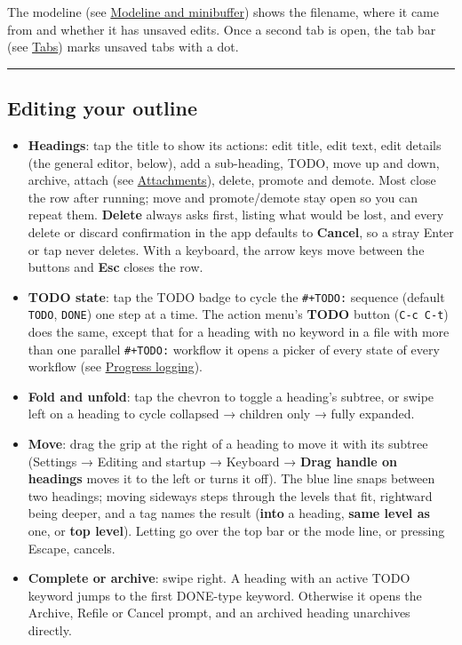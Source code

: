 \documentclass[11pt]{article}
\begin{document}
The modeline (see \hyperref[sec:org87b300e]{Modeline and minibuffer}) shows the filename, where it came from and whether it has unsaved edits. Once a second tab is open, the tab bar (see \hyperref[sec:orgb1922d6]{Tabs}) marks unsaved tabs with a dot.

\noindent\rule{\textwidth}{0.5pt}

\subsection{Editing your outline}
\label{sec:org1979749}
\begin{itemize}
\item \textbf{Headings}: tap the title to show its actions: edit title, edit text, edit details (the general editor, below), add a sub-heading, TODO, move up and down, archive, attach (see \hyperref[sec:org970e59b]{Attachments}), delete, promote and demote. Most close the row after running; move and promote/demote stay open so you can repeat them. \textbf{Delete} always asks first, listing what would be lost, and every delete or discard confirmation in the app defaults to \textbf{Cancel}, so a stray Enter or tap never deletes. With a keyboard, the arrow keys move between the buttons and \textbf{Esc} closes the row.
\item \textbf{TODO state}: tap the TODO badge to cycle the \texttt{\#+TODO:} sequence (default \texttt{TODO}, \texttt{DONE}) one step at a time. The action menu's \textbf{TODO} button (\texttt{C-c C-t}) does the same, except that for a heading with no keyword in a file with more than one parallel \texttt{\#+TODO:} workflow it opens a picker of every state of every workflow (see \hyperref[sec:orgfbb8a58]{Progress logging}).
\item \textbf{Fold and unfold}: tap the chevron to toggle a heading's subtree, or swipe left on a heading to cycle collapsed → children only → fully expanded.
\item \textbf{Move}: drag the grip at the right of a heading to move it with its subtree (Settings → Editing and startup → Keyboard → \textbf{Drag handle on headings} moves it to the left or turns it off). The blue line snaps between two headings; moving sideways steps through the levels that fit, rightward being deeper, and a tag names the result (\textbf{into} a heading, \textbf{same level as} one, or \textbf{top level}). Letting go over the top bar or the mode line, or pressing Escape, cancels.
\item \textbf{Complete or archive}: swipe right. A heading with an active TODO keyword jumps to the first DONE-type keyword. Otherwise it opens the Archive, Refile or Cancel prompt, and an archived heading unarchives directly.

\end{itemize}
\end{document}
